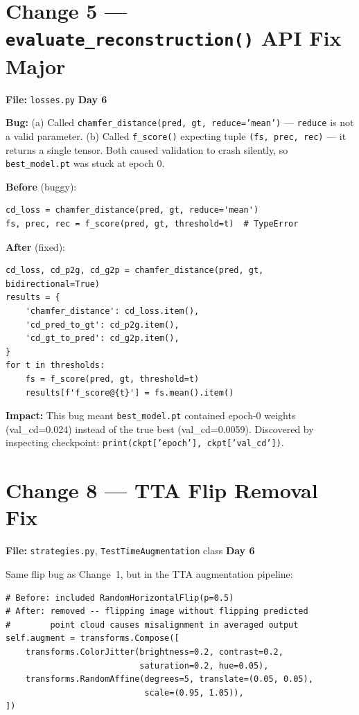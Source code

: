 \documentclass[10pt,a4paper]{article}
\begin{document}
\section*{Change 5 --- \texttt{evaluate\_reconstruction()} API Fix \hfill \normalfont\small Major}

\textbf{File:} \texttt{losses.py} \hfill \textbf{Day 6}

\textbf{Bug:} (a) Called \texttt{chamfer\_distance(pred, gt, reduce='mean')} --- \texttt{reduce} is not a valid parameter. (b) Called \texttt{f\_score()} expecting tuple \texttt{(fs, prec, rec)} --- it returns a single tensor. Both caused validation to crash silently, so \texttt{best\_model.pt} was stuck at epoch 0.

\vspace{4pt}
\textbf{Before} \textcolor{bugred}{(buggy)}:
\begin{lstlisting}
cd_loss = chamfer_distance(pred, gt, reduce='mean')
fs, prec, rec = f_score(pred, gt, threshold=t)  # TypeError
\end{lstlisting}

\textbf{After} \textcolor{fixgreen}{(fixed)}:
\begin{lstlisting}
cd_loss, cd_p2g, cd_g2p = chamfer_distance(pred, gt, bidirectional=True)
results = {
    'chamfer_distance': cd_loss.item(),
    'cd_pred_to_gt': cd_p2g.item(),
    'cd_gt_to_pred': cd_g2p.item(),
}
for t in thresholds:
    fs = f_score(pred, gt, threshold=t)
    results[f'f_score@{t}'] = fs.mean().item()
\end{lstlisting}

\textbf{Impact:} This bug meant \texttt{best\_model.pt} contained epoch-0 weights (val\_cd=0.024) instead of the true best (val\_cd=0.0059). Discovered by inspecting checkpoint: \texttt{print(ckpt['epoch'], ckpt['val\_cd'])}.

\section*{Change 8 --- TTA Flip Removal \hfill \normalfont\small Fix}

\textbf{File:} \texttt{strategies.py}, \texttt{TestTimeAugmentation} class \hfill \textbf{Day 6}

Same flip bug as Change~1, but in the TTA augmentation pipeline:
\begin{lstlisting}
# Before: included RandomHorizontalFlip(p=0.5)
# After: removed -- flipping image without flipping predicted
#        point cloud causes misalignment in averaged output
self.augment = transforms.Compose([
    transforms.ColorJitter(brightness=0.2, contrast=0.2,
                           saturation=0.2, hue=0.05),
    transforms.RandomAffine(degrees=5, translate=(0.05, 0.05),
                            scale=(0.95, 1.05)),
])
\end{lstlisting}
\end{document}
